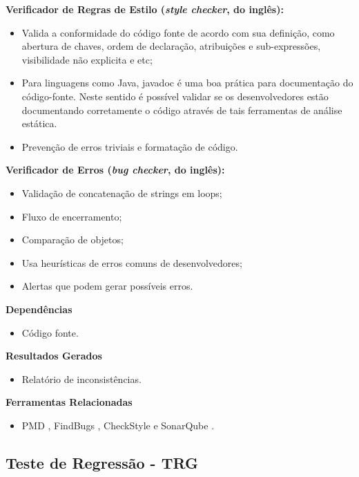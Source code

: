 \textbf{ Verificador de Regras de Estilo (\textit{style checker}, do inglês): }
\begin{itemize}
    \item Valida a conformidade do código fonte de acordo com sua definição, como abertura de chaves, ordem de declaração, atribuições e sub-expressões, visibilidade não explicita e etc;
    \item Para linguagens como Java, javadoc é uma boa prática para documentação do código-fonte. Neste sentido é possível validar se os desenvolvedores estão documentando corretamente o código através de tais ferramentas de análise estática.
    \item Prevenção de erros triviais e formatação de código.
\end{itemize}

\textbf{Verificador de Erros (\textit{bug checker}, do inglês):}

\begin{itemize}
    \item Validação de concatenação de strings em loops;
    \item Fluxo de encerramento;
    \item Comparação de objetos;
    \item Usa heurísticas de erros comuns de desenvolvedores;
    \item Alertas que podem gerar possíveis erros.
\end{itemize}

\textbf{ Dependências }
\begin{itemize}
    \item Código fonte.
\end{itemize}

\textbf{ Resultados Gerados }
\begin{itemize}
    \item Relatório de inconsistências.
\end{itemize}

\textbf{ Ferramentas Relacionadas }
\begin{itemize}
    \item PMD \cite{PMD}, FindBugs \cite{FindBugs}, CheckStyle \cite{CheckStyle} e SonarQube \cite{SonarQube}.
\end{itemize}

\subsection{Teste de Regressão - TRG}
\label{sec:trg}

